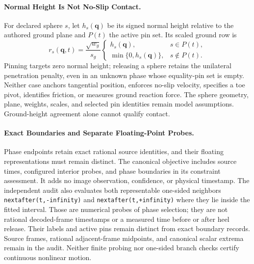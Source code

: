 \documentclass[11pt,letterpaper]{article}
\newcommand{\code}[1]{\nolinkurl{#1}}
\begin{document}
\paragraph{Normal Height Is Not No-Slip Contact.}
For declared sphere $s$, let $h_s(\mathbf q)$ be its signed normal height
relative to the authored ground plane and $P(t)$ the active pin set. Its
scaled ground row is
\begin{equation}
 r_s(\mathbf q,t)=\frac{\sqrt{w_g}}{s_g}
 \begin{cases}
 h_s(\mathbf q),&s\in P(t),\\
 \min\{0,h_s(\mathbf q)\},&s\notin P(t).
 \end{cases}
\end{equation}
Pinning targets zero normal height; releasing a sphere retains the unilateral
penetration penalty, even in an unknown phase whose equality-pin set is empty.
Neither case anchors tangential position, enforces no-slip velocity, specifies
a toe pivot, identifies friction, or measures ground reaction force. The
sphere geometry, plane, weights, scales, and selected pin identities remain
model assumptions. Ground-height agreement alone cannot qualify contact.

\paragraph{Exact Boundaries and Separate Floating-Point Probes.}
Phase endpoints retain exact rational source identities, and their floating
representations must remain distinct. The canonical objective includes source
times, configured interior probes, and phase boundaries in its constraint
assessment. It adds no image observation, confidence, or physical timestamp.
The independent audit also evaluates both representable one-sided neighbors
\code{nextafter(t,-infinity)} and \code{nextafter(t,+infinity)} where they lie
inside the fitted interval. Those are numerical probes of phase selection;
they are not rational decoded-frame timestamps or a measured time before or
after heel release. Their labels and active pins remain distinct from exact
boundary records. Source frames, rational adjacent-frame midpoints, and
canonical scalar extrema remain in the audit. Neither finite probing nor
one-sided branch checks certify continuous nonlinear motion.
\end{document}
